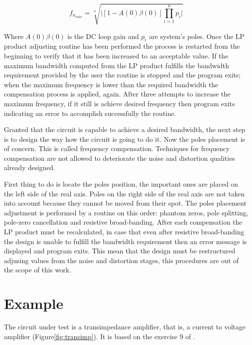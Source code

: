 \documentclass[conference]{IEEEtran}
\begin{document}
\begin{equation}\label{eq:lp_prod}
f_{n_{max}}=\sqrt[n]{\Biggl|[1-A(0)\beta(0)]\prod_{i=1}^np_i\Biggr|}
\end{equation} 

Where $A(0)\beta(0)$ is the DC loop gain and $p_i$ are system's poles. Once the LP product adjusting routine has been performed the process is restarted from the beginning to verify that it has been increased to an acceptable value. If the maximum bandwidth computed from the LP product fulfills the bandwidth requirement provided by the user the routine is stopped and the program exits; when the maximum frequency is lower than the required bandwidth the compensation process is applied, again. After three attempts to increase the maximum frequency, if it still is achieve desired frequency then program exits indicating an error to accomplish successfully the routine. 

Granted that the circuit is capable to achieve a desired bandwidth, the next step is to design the way how the circuit is going to do it. Now the poles placement is of concern. This is called frequency compensation. Techniques for frequency compensation are not allowed to deteriorate the noise and distortion qualities already designed.

First thing to do is locate the poles position, the important ones are placed on the left side of the real axis. Poles on the right side of the real axis are not taken into account because they cannot be moved from their spot. The poles placement adjustment is performed by a routine on this order: phantom zeros, pole splitting, pole-zero cancellation and resistive broad-banding. After each compensation the LP product must be recalculated, in case that even after resistive broad-banding the design is unable to fulfill the bandwidth requirement then an error message is displayed and program exits. This mean that the design must be restructured adjusing values from the noise and distortion stages, this procedures are out of the scope of this work.

\section{Example}
The circuit under test is a transimpedance amplifier, that is, a current to voltage amplifier (Figure\ref{fig:transimp}). It is based on the exercise 9 of \cite{verhoeven}.
\end{document}
